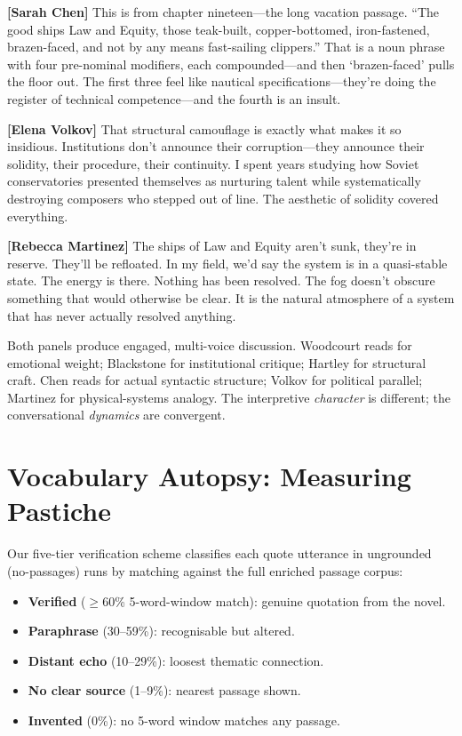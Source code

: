 \documentclass[letterpaper]{article}
\begin{document}
\noindent\textbf{[Sarah Chen]}
This is from chapter nineteen---the long vacation passage.  ``The good
ships Law and Equity, those teak-built, copper-bottomed,
iron-fastened, brazen-faced, and not by any means fast-sailing
clippers.''  That is a noun phrase with four pre-nominal modifiers,
each compounded---and then `brazen-faced' pulls the floor out.  The
first three feel like nautical specifications---they're doing the
register of technical competence---and the fourth is an insult.

\noindent\textbf{[Elena Volkov]}
That structural camouflage is exactly what makes it so insidious.
Institutions don't announce their corruption---they announce their
solidity, their procedure, their continuity.  I spent years studying
how Soviet conservatories presented themselves as nurturing talent
while systematically destroying composers who stepped out of line.
The aesthetic of solidity covered everything.

\noindent\textbf{[Rebecca Martinez]}
The ships of Law and Equity aren't sunk, they're in reserve.
They'll be refloated.  In my field, we'd say the system is in a
quasi-stable state.  The energy is there.  Nothing has been resolved.
The fog doesn't obscure something that would otherwise be clear.  It
is the natural atmosphere of a system that has never actually resolved
anything.

\medskip
\noindent Both panels produce engaged, multi-voice discussion.
Woodcourt reads for emotional weight; Blackstone for institutional
critique; Hartley for structural craft.  Chen reads for actual
syntactic structure; Volkov for political parallel; Martinez for
physical-systems analogy.  The interpretive \emph{character} is
different; the conversational \emph{dynamics} are convergent.

\section{Vocabulary Autopsy: Measuring Pastiche}

Our five-tier verification scheme classifies each quote utterance in
ungrounded (no-passages) runs by matching against the full enriched
passage corpus:

\begin{itemize}
\item \textbf{Verified} ($\geq$60\% 5-word-window match): genuine
quotation from the novel.
\item \textbf{Paraphrase} (30--59\%): recognisable but altered.
\item \textbf{Distant echo} (10--29\%): loosest thematic connection.
\item \textbf{No clear source} (1--9\%): nearest passage shown.
\item \textbf{Invented} (0\%): no 5-word window matches any passage.
\end{itemize}
\end{document}
